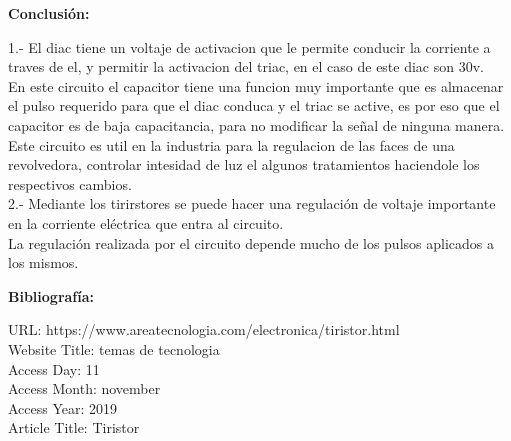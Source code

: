 \documentclass[letterpaper]{article}
\begin{document}
   
    

\begin{LARGE}
\textbf{Conclusión:}\\
\end{LARGE}
\begin{large}
  1.-  El diac tiene un voltaje de activacion que le permite conducir la corriente a traves de el, y permitir la activacion del triac, en el caso de este diac son 30v.\\
    En este circuito el capacitor tiene una funcion muy importante que es almacenar el pulso requerido para que el diac conduca y el triac se active, es por eso que el capacitor es de baja capacitancia, para no modificar la señal de ninguna manera.\\
    Este circuito es util en la industria para la regulacion de las faces de una revolvedora, controlar intesidad de luz el algunos tratamientos haciendole los respectivos cambios.\\
2.- Mediante los tirirstores se puede hacer una regulación de voltaje importante en la corriente eléctrica que entra al circuito.\\
    La regulación realizada por el circuito depende mucho de los pulsos aplicados a los mismos.\\
\end{large}





\begin{LARGE}
\textbf{Bibliografía:}\\
\end{LARGE}
    URL: https://www.areatecnologia.com/electronica/tiristor.html\\
    Website Title: temas de tecnologia\\
    Access Day: 11\\
    Access Month: november\\
    Access Year: 2019\\
    Article Title: Tiristor\\
\end{document}
